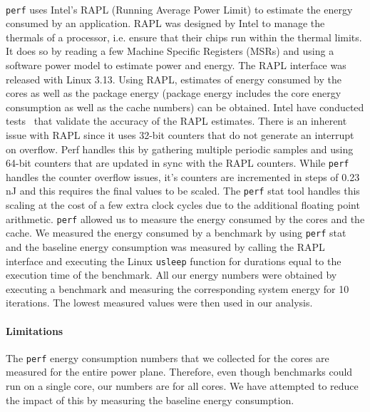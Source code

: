 \paragraph{}\texttt{perf} uses Intel's RAPL (Running Average Power Limit) to estimate the energy consumed by an application. 
RAPL was designed by Intel to manage the thermals of a processor, i.e. ensure that their chips run within the thermal limits. It does so by reading a 
few Machine Specific Registers (MSRs) and using a software power model to estimate power and energy. The RAPL interface 
was released with Linux 3.13. Using RAPL, estimates of energy consumed by the cores as well as the package energy 
(package energy includes the core energy consumption as well as the cache numbers) can be obtained. Intel have 
conducted tests~\cite{rotem2012power} that validate the accuracy of the RAPL estimates.
There is an inherent issue with RAPL since it uses 32-bit counters that do not generate an interrupt on overflow. 
Perf handles this by gathering multiple periodic samples and using 64-bit counters that are updated in sync with 
the RAPL counters. While \texttt{perf} handles the counter overflow issues, it’s counters are incremented in steps of 0.23 nJ 
and this requires the final values to be scaled. The \texttt{perf} stat tool handles this scaling at the cost of a few extra 
clock cycles due to the additional floating point arithmetic. \texttt{perf} allowed us to measure the energy consumed by the cores and the cache.
We measured the energy consumed by a benchmark by using \texttt{perf} stat and the baseline energy consumption was measured 
by calling the RAPL interface and executing the Linux \texttt{usleep} function for durations equal to the execution time 
of the benchmark. All our energy numbers were obtained by executing a benchmark and measuring the corresponding 
system energy for 10 iterations. The lowest measured values were then used in our analysis.


\paragraph{Limitations}
 The \texttt{perf} energy consumption numbers that we collected for the cores are measured for the entire power plane. 
Therefore, even though benchmarks could run on a single core, our numbers are for all cores. We have attempted to 
reduce the impact of this by measuring the baseline energy consumption.
  
